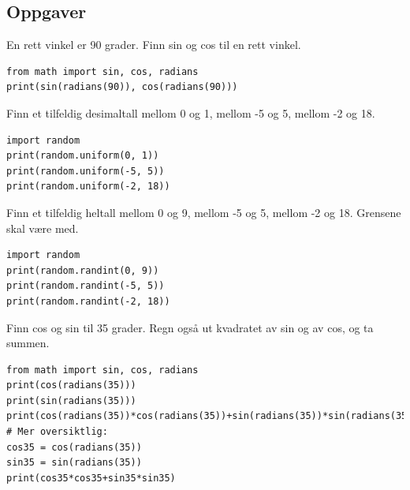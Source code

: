 \subsection{Oppgaver}

\begin{exercise}
En rett vinkel er 90 grader. Finn sin og cos til en rett vinkel.
\end{exercise}
\begin{solution}
\begin{lstlisting}
from math import sin, cos, radians
print(sin(radians(90)), cos(radians(90)))
\end{lstlisting}
\end{solution}

\begin{exercise}
Finn et tilfeldig desimaltall mellom 0 og 1, mellom -5 og 5, mellom -2 og 18.
\end{exercise}
\begin{solution}
\begin{lstlisting}
import random
print(random.uniform(0, 1))
print(random.uniform(-5, 5))
print(random.uniform(-2, 18))
\end{lstlisting}
\end{solution}

\begin{exercise}
Finn et tilfeldig heltall mellom 0 og 9, mellom -5 og 5, mellom -2 og 18. Grensene skal være med.
\end{exercise}
\begin{solution}
\begin{lstlisting}
import random
print(random.randint(0, 9))
print(random.randint(-5, 5))
print(random.randint(-2, 18))
\end{lstlisting}
\end{solution}

\begin{exercise}
Finn cos og sin til 35 grader. Regn også ut kvadratet av sin og av cos, og ta summen.
\end{exercise}
\begin{solution}
\begin{lstlisting}
from math import sin, cos, radians
print(cos(radians(35)))
print(sin(radians(35)))
print(cos(radians(35))*cos(radians(35))+sin(radians(35))*sin(radians(35)))
# Mer oversiktlig:
cos35 = cos(radians(35))
sin35 = sin(radians(35))
print(cos35*cos35+sin35*sin35)
\end{lstlisting}
\end{solution}

